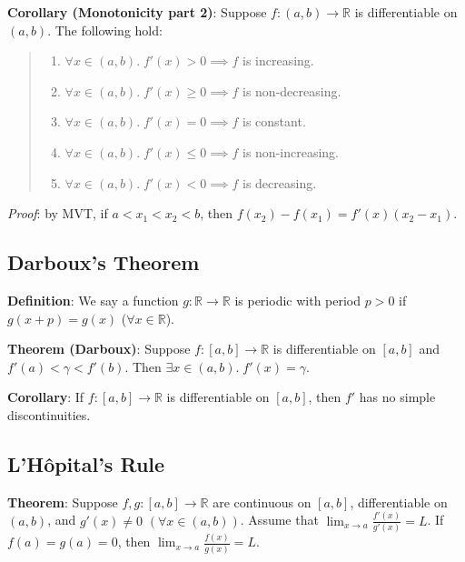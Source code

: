 \documentclass[11pt]{article}
\begin{document}
\textbf{Corollary (Monotonicity part 2)}: Suppose $f : (a,b) \to \mathbb{R}$ is differentiable on $(a,b)$. The following hold:
\begin{quote}\vspace{-0.3cm}
	\begin{enumerate}
	\item $\forall x \in (a,b).\; f'(x) > 0 \implies f$ is increasing.
	\item $\forall x \in (a,b).\; f'(x) \geq 0 \implies f$ is non-decreasing.
	\item $\forall x \in (a,b).\; f'(x) = 0 \implies f$ is constant.
	\item $\forall x \in (a,b).\; f'(x) \leq 0 \implies f$ is non-increasing.
	\item $\forall x \in (a,b).\; f'(x) < 0 \implies f$ is decreasing.
	\end{enumerate}
\end{quote}

\emph{Proof}: by MVT, if $a < x_1 < x_2 < b$, then $f(x_2) - f(x_1) = f'(x) (x_2 - x_1)$.

\subsection{Darboux's Theorem}

\textbf{Definition}: We say a function $g : \mathbb{R} \to \mathbb{R}$ is periodic with period $p > 0$ if $g(x+p) = g(x)$ ($\forall x \in \mathbb{R}$).



\textbf{Theorem (Darboux)}: Suppose $f : [a,b] \to \mathbb{R}$ is differentiable on $[a,b]$ and $f'(a) < \gamma < f'(b)$. Then $\exists x \in (a,b).\; f'(x) = \gamma$.

\textbf{Corollary}: If $f : [a,b] \to \mathbb{R}$ is differentiable on $[a,b]$, then $f'$ has no simple discontinuities.

\subsection{L'H\^{o}pital's Rule}

\textbf{Theorem}: Suppose $f,g : [a,b] \to \mathbb{R}$ are continuous on $[a,b]$, differentiable on $(a,b)$, and $g'(x) \neq 0$ $(\forall x \in (a,b))$. Assume that $\lim_{x \to a} \frac{f'(x)}{g'(x)} = L$. If $f(a) = g(a) = 0$, then $\lim_{x \to a} \frac{f(x)}{g(x)} = L$.
\end{document}
